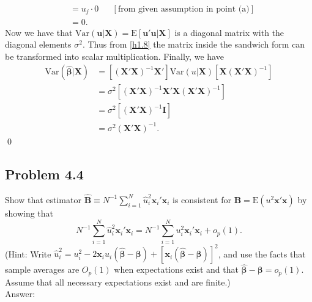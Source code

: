 \documentclass[10pt]{article}
\newcommand{\E}{\text{E}}
\newcommand{\V}{\text{Var}}
\begin{document}
\begin{enumerate}
\begin{align*}
    &=u_j\cdot 0& &[\text{from given assumption in point (a)}]\\
    &=0.
\end{align*}
Now we have that $\V({\textbf{u}}|\textbf{X})=\E[\mathbf{u'u}|\textbf{X}]$ is a diagonal matrix with the diagonal elements $\sigma^2$. Thus from \eqref{h1.8} the matrix inside the sandwich form can be transformed into scalar multiplication. Finally, we have
\begin{align*}
    \V(\hat{\pmb{\beta}}|\textbf{X})&=[(\mathbf{X'X})^{-1}\mathbf{X'}]\V({u}|\textbf{X})[\textbf{X}(\mathbf{X'X})^{-1}] \\
    &=\sigma^2[(\mathbf{X'X})^{-1}\mathbf{X'}\textbf{X}(\mathbf{X'X})^{-1}] \\
    &=\sigma^2[(\mathbf{X'X})^{-1}\textbf{I}] \\
    &=\sigma^2(\mathbf{X'X})^{-1}.
\end{align*}\qed
\end{enumerate}

\subsection*{Problem 4.4}
Show that estimator $\hat{\mathbf{B}}\equiv N^{-1} \sum_{i=1}^{N}\hat{u}_i^2 \mathbf{x}_i'\mathbf{x}_i$ is consistent for $\mathbf{B}=\E(u^2\mathbf{x}'\mathbf{x})$ by showing that 
\[N^{-1} \sum_{i=1}^{N}\hat{u}_i^2 \mathbf{x}_i'\mathbf{x}_i=N^{-1} \sum_{i=1}^{N}u_i^2 \mathbf{x}_i'\mathbf{x}_i+o_p(1).\]
(Hint: Write $\hat{u}_i^2=u_i^2-2\mathbf{x}_i u_i (\pmb{\hat{\beta}}-\pmb{\beta})+[\mathbf{x}_i (\pmb{\hat{\beta}}-\pmb{\beta})]^2$, and use the facts that sample averages are $O_p(1)$ when expectations exist and that $\pmb{\hat{\beta}}-\pmb{\beta}=o_p(1).$ Assume that all necessary expectations exist and are finite.)
\\ Answer:\\
\end{document}
